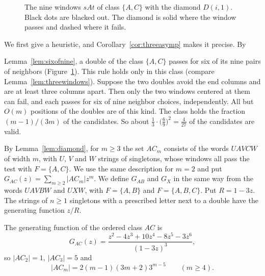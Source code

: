 \begin{figure}[t]
\centering
\resizebox{0.85\textwidth}{!}{}
\caption{The nine windows $sAt$ of class $\{A,C\}$ with the diamond $D(i,1)$. Black dots are
blacked out. The diamond is solid where the window passes and dashed where it fails.}
\label{fig:sixofnine}
\end{figure}

We first give a heuristic, and Corollary~\ref{cor:threeasymp} makes it precise. By

Lemma~\ref{lem:sixofnine}, a double of the class $\{A,C\}$ passes for six of its nine pairs of
neighbors (Figure~\ref{fig:sixofnine}). This rule holds only in this class (compare
Lemma~\ref{lem:threewindows}). Suppose the two doubles avoid the end columns and are at least
three columns apart. Then only the two windows centered at them can fail, and each passes for
six of nine neighbor choices, independently. All but $O(m)$ positions of the doubles are of
this kind. The class holds the fraction $(m-1)/(3m)$ of the candidates. So about
$\frac13\cdot\bigl(\frac69\bigr)^2=\frac4{27}$ of the candidates are valid.

By Lemma~\ref{lem:diamond}, for $m\ge3$ the set $AC_m$ consists of the words $UAVCW$ of width
$m$, with $U$, $V$ and $W$ strings of singletons, whose windows all pass the test with
$F=\{A,C\}$. We use the same description for $m=2$ and put $G_{AC}(z)=\sum_{m\ge2}|AC_m|z^m$.
We define $G_{AB}$ and $G_X$ in the same way from the words $UAVBW$ and $UXW$, with $F=\{A,B\}$
and $F=\{A,B,C\}$. Put $R=1-3z$. The strings of $n\ge1$ singletons with a prescribed letter
next to a double have the generating function $z/R$.

\begin{proposition}\label{prop:threeGAC}
The generating function of the ordered class $AC$ is
\begin{equation}\label{eq:GAC}
G_{AC}(z)=\frac{z^2-4z^3+10z^4-8z^5-3z^6}{(1-3z)^3},
\end{equation}
so $|AC_2|=1$, $|AC_3|=5$ and
\begin{equation}\label{eq:GACcoef}
|AC_m|=2(m-1)(3m+2)3^{m-5}\qquad(m\ge4).
\end{equation}
\end{proposition}

